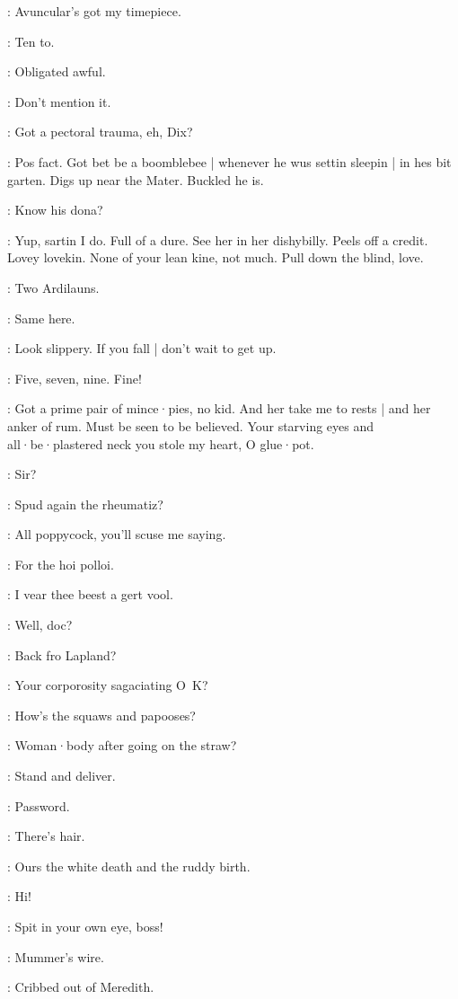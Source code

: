 \Bloom:
Avuncular's got my timepiece.

\madden:
Ten to.

\Bloom:
Obligated awful.

\madden:
Don't mention it.

\lynch:
Got a pectoral trauma,
eh,
Dix?

\dixon:
Pos fact.
Got bet be a boomblebee |
whenever he wus settin sleepin |
in hes bit garten.
Digs up near the Mater.
Buckled he is.

\lynch:
Know his dona?

\dixon:
Yup,
sartin I do.
Full of a dure.
See her in her dishybilly.
Peels off a credit.
Lovey lovekin.
None of your lean kine,
not much.
Pull down the blind,
love.

\madden:
Two Ardilauns.

\lynch:
Same here.

\Bloom:
Look slippery.
If you fall |
don't wait to get up.

\barman:
Five,
seven,
nine.
Fine!

\dixon:
Got a prime pair of mince·pies,
no kid.
And her take me to rests |
and her anker of rum.
Must be seen to be believed.
Your starving eyes and all·be·plastered neck you stole my heart,
O glue·pot.

\barman:
Sir?

\bannon:
Spud again the rheumatiz?

\mulligan:
All poppycock,
you'll scuse me saying.

\lynch:
For the hoi polloi.

\crotthers:
I vear thee beest a gert vool.

\punch:
Well,
doc?

\lynch:
Back fro Lapland?

\lenehan:
Your corporosity sagaciating O~K?

\bannon:
How's the squaws and papooses?

\dixon:
Woman·body after going on the straw?

\lenehan:
Stand and deliver.

\crotthers:
Password.

\punch:
There's hair.

\lenehan:
Ours the white death and the ruddy birth.

\dixon:
Hi!

\bannon:
Spit in your own eye,
boss!

\lenehan:
Mummer's wire.

\stephen:
Cribbed out of Meredith.

